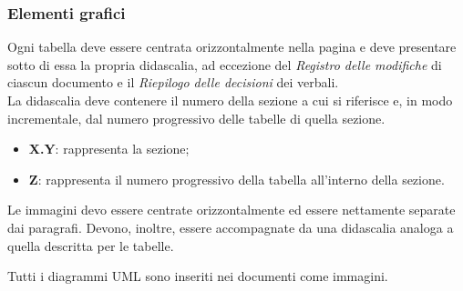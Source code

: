 \subsubsection{Elementi grafici}
Ogni tabella deve essere centrata orizzontalmente nella pagina e deve presentare sotto di essa la propria didascalia, ad eccezione del \textit{Registro delle modifiche} di ciascun documento e il \textit{Riepilogo delle decisioni} dei verbali. \\
La didascalia deve contenere il numero della sezione a cui si riferisce e, in modo incrementale, dal numero progressivo delle tabelle di quella sezione.
\begin{itemize}
	\item \textbf{X.Y}: rappresenta la sezione;
	\item \textbf{Z}: rappresenta il numero progressivo della tabella all'interno della sezione.
\end{itemize}

Le immagini devo essere centrate orizzontalmente ed essere nettamente separate dai paragrafi. Devono, inoltre, essere accompagnate da una didascalia analoga a quella descritta per le tabelle.

Tutti i diagrammi UML sono inseriti nei documenti come immagini.